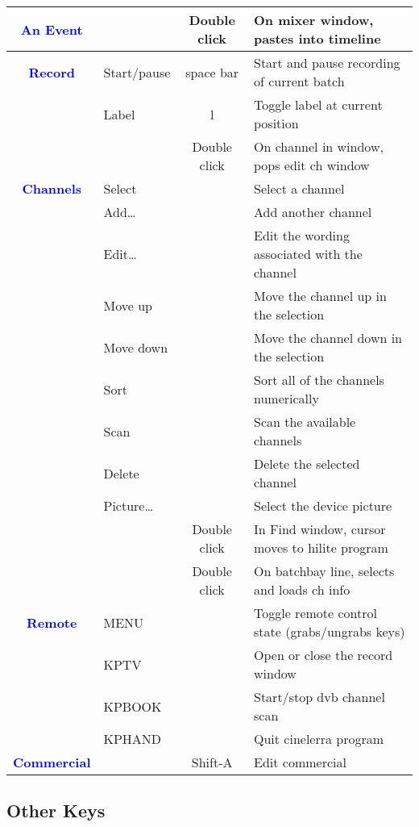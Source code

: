 \begin{center}
\begin{longtable}{ >{\bfseries}c l c p{6cm}}
        \textcolor{blue}{An Event} &  & Double click & On mixer window, pastes into timeline \\
        \midrule
        \textcolor{blue}{Record} & Start/pause & space bar & Start and pause recording of current batch \\        
        & Label & l & Toggle label at current position \\        
        &  & Double click & On channel in window, pops edit ch window \\
        \midrule
        \textcolor{blue}{Channels} & Select &  & Select a channel \\        
        & Add\dots &  & Add another channel \\        
        & Edit\dots &  & Edit the wording associated with the channel \\        
        & Move up &  & Move the channel up in the selection \\        
        & Move down &  & Move the channel down in the selection \\        
        & Sort &  & Sort all of the channels numerically \\        
        & Scan &  & Scan the available channels \\        
        & Delete &  & Delete the selected channel \\        
        & Picture\dots &  & Select the device picture \\        
        &  & Double click & In Find window, cursor moves to hilite program \\        
        &  & Double click & On batchbay line, selects and loads ch info \\
        \midrule
        \textcolor{blue}{Remote} & MENU &  & Toggle remote control state (grabs/ungrabs keys) \\        
        & KPTV &  & Open or close the record window \\        
        & KPBOOK &  & Start/stop dvb channel scan \\        
        & KPHAND &  & Quit cinelerra program \\
        \midrule
        \textcolor{blue}{Commercial} &  & Shift-A & Edit commercial\\        
                
        \bottomrule  
    \end{longtable}
\end{center}

\subsection{Other Keys }%
\label{ssec:other_keys}

